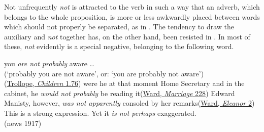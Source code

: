  \label{p:48}
Not unfrequently \textit{not} is attracted to the verb in such a way that an adverb, which belongs to the whole proposition, is more or less awkwardly placed between words which should not properly be separated, as in . The tendency to draw the auxiliary and \textit{not} together has, on the other hand, been resisted in %
. In most of these, \textit{not} evidently is a special negative, belonging to the following word.

\ea \label{ex:05-45}
\ea
you \textit{are not probably} aware {\dots}\\(`probably you are not aware', or: `you are probably not aware')\\\hfill(\href{https://archive.org/details/dukeschildrennov00troluoft/page/38/mode/2up?q=%22are+not+probably+aware%22&view=theater}{Trollope, \textit{Children} 1.76})
\ex
were he at that moment Home Secretary and in the cabinet, he \textit{would not probably} be reading it\hfill(\href{https://archive.org/details/marriageofwillia0000mrsh_i0u5/page/268/mode/2up?q=%22were+he+at+that+moment+Home+Secretary%22&view=theater}{Ward, \textit{Marriage} 228})
\ex
Edward Manisty, however, \textit{was not apparently} consoled by her remarks\hfill(\href{https://archive.org/details/cu31924013567130/page/2/mode/2up?q=%22not+apparently+consoled%22&view=theater}{Ward, \textit{Eleanor} 2}) %
\ex
This is a strong expression. Yet it \textit{is not perhaps} exaggerated.\\\hfill(news 1917)
\z
\z
{}

